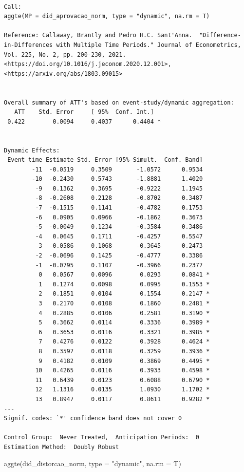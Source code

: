 \documentclass[
  letterpaper,
  DIV=11,
  numbers=noendperiod]{scrartcl}
\newenvironment{Shaded}{\begin{snugshade}}{\end{snugshade}}
\newcommand{\AttributeTok}[1]{\textcolor[rgb]{0.40,0.45,0.13}{#1}}
\newcommand{\FunctionTok}[1]{\textcolor[rgb]{0.28,0.35,0.67}{#1}}
\newcommand{\NormalTok}[1]{\textcolor[rgb]{0.00,0.23,0.31}{#1}}
\newcommand{\StringTok}[1]{\textcolor[rgb]{0.13,0.47,0.30}{#1}}
\begin{document}
\begin{verbatim}

Call:
aggte(MP = did_aprovacao_norm, type = "dynamic", na.rm = T)

Reference: Callaway, Brantly and Pedro H.C. Sant'Anna.  "Difference-in-Differences with Multiple Time Periods." Journal of Econometrics, Vol. 225, No. 2, pp. 200-230, 2021. <https://doi.org/10.1016/j.jeconom.2020.12.001>, <https://arxiv.org/abs/1803.09015> 


Overall summary of ATT's based on event-study/dynamic aggregation:  
   ATT    Std. Error     [ 95%  Conf. Int.]  
 0.422        0.0094     0.4037      0.4404 *


Dynamic Effects:
 Event time Estimate Std. Error [95% Simult.  Conf. Band]  
        -11  -0.0519     0.3509       -1.0572      0.9534  
        -10  -0.2430     0.5743       -1.8881      1.4020  
         -9   0.1362     0.3695       -0.9222      1.1945  
         -8  -0.2608     0.2128       -0.8702      0.3487  
         -7  -0.1515     0.1141       -0.4782      0.1753  
         -6   0.0905     0.0966       -0.1862      0.3673  
         -5  -0.0049     0.1234       -0.3584      0.3486  
         -4   0.0645     0.1711       -0.4257      0.5547  
         -3  -0.0586     0.1068       -0.3645      0.2473  
         -2  -0.0696     0.1425       -0.4777      0.3386  
         -1  -0.0795     0.1107       -0.3966      0.2377  
          0   0.0567     0.0096        0.0293      0.0841 *
          1   0.1274     0.0098        0.0995      0.1553 *
          2   0.1851     0.0104        0.1554      0.2147 *
          3   0.2170     0.0108        0.1860      0.2481 *
          4   0.2885     0.0106        0.2581      0.3190 *
          5   0.3662     0.0114        0.3336      0.3989 *
          6   0.3653     0.0116        0.3321      0.3985 *
          7   0.4276     0.0122        0.3928      0.4624 *
          8   0.3597     0.0118        0.3259      0.3936 *
          9   0.4182     0.0109        0.3869      0.4495 *
         10   0.4265     0.0116        0.3933      0.4598 *
         11   0.6439     0.0123        0.6088      0.6790 *
         12   1.1316     0.0135        1.0930      1.1702 *
         13   0.8947     0.0117        0.8611      0.9282 *
---
Signif. codes: `*' confidence band does not cover 0

Control Group:  Never Treated,  Anticipation Periods:  0
Estimation Method:  Doubly Robust
\end{verbatim}

\begin{Shaded}
\begin{Highlighting}[]
\FunctionTok{aggte}\NormalTok{(did\_distorcao\_norm, }\AttributeTok{type =} \StringTok{"dynamic"}\NormalTok{, }\AttributeTok{na.rm =}\NormalTok{ T)}
\end{Highlighting}
\end{Shaded}
\end{document}
